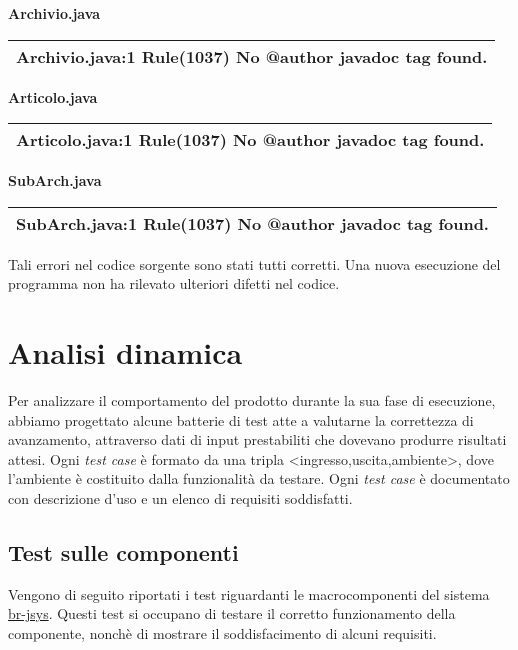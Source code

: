 \textbf{Archivio.java}
\begin{center}
\begin{tabular}{|p{12cm}|} \hline
Archivio.java:1 Rule(1037) No @author javadoc tag found.\\ \hline
\end{tabular}
\end{center}

\textbf{Articolo.java}
\begin{center}
\begin{tabular}{|p{12cm}|} \hline
Articolo.java:1 Rule(1037) No @author javadoc tag found.\\ \hline
\end{tabular}
\end{center}

\textbf{SubArch.java}
\begin{center}
\begin{tabular}{|p{12cm}|} \hline
SubArch.java:1 Rule(1037) No @author javadoc tag found.\\ \hline
\end{tabular}
\end{center}

Tali errori nel codice sorgente sono stati tutti corretti. Una nuova esecuzione del programma non ha rilevato ulteriori difetti nel codice.

\chapter{Analisi dinamica}
Per analizzare il comportamento del prodotto durante la sua fase di esecuzione, abbiamo progettato alcune batterie di test atte a valutarne la correttezza di avanzamento, attraverso dati di input prestabiliti che dovevano produrre risultati attesi.
Ogni \textit{test case} \`e formato da una tripla <ingresso,uscita,ambiente>, dove l'ambiente \`e costituito dalla funzionalit\`a da testare.
Ogni \textit{test case} \`e documentato con descrizione d'uso e un elenco di requisiti soddisfatti. 


\section{Test sulle componenti}
Vengono di seguito riportati i test riguardanti le macrocomponenti del sistema \underline{br-jsys}. Questi test si occupano di testare il corretto funzionamento della componente, nonch\`e di mostrare il soddisfacimento di alcuni requisiti.

